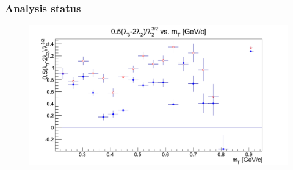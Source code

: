 \documentclass{beamer}
\begin{document}
\begin{frame}
\frametitle{Analysis status}
\begin{figure}
\includegraphics[scale=0.3]{pic/l4}
\end{figure}
\end{frame}
\end{document}
